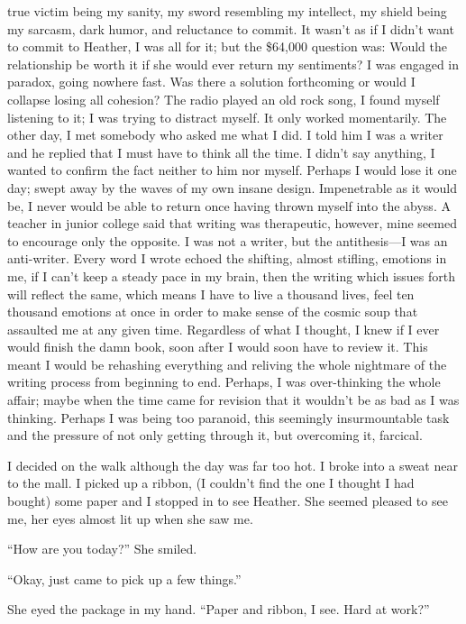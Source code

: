 true victim being my sanity, my sword resembling my intellect, my shield
being my sarcasm, dark humor, and reluctance to commit. It wasn't as if
I didn't want to commit to Heather, I was all for it; but the \$64,000
question was: Would the relationship be worth it if she would ever
return my sentiments? I was engaged in paradox, going nowhere fast. Was
there a solution forthcoming or would I collapse losing all cohesion?
The radio played an old rock song, I found myself listening to it; I was
trying to distract myself. It only worked momentarily. The other day, I
met somebody who asked me what I did. I told him I was a writer and he
replied that I must have to think all the time. I didn't say anything, I
wanted to confirm the fact neither to him nor myself. Perhaps I would
lose it one day; swept away by the waves of my own insane design.
Impenetrable as it would be, I never would be able to return once having
thrown myself into the abyss. A teacher in junior college said that
writing was therapeutic, however, mine seemed to encourage only the
opposite. I was not a writer, but the antithesis---I was an anti-writer.
Every word I wrote echoed the shifting, almost stifling, emotions in me,
if I can't keep a steady pace in my brain, then the writing which issues
forth will reflect the same, which means I have to live a thousand
lives, feel ten thousand emotions at once in order to make sense of the
cosmic soup that assaulted me at any given time. Regardless of what I
thought, I knew if I ever would finish the damn book, soon after I would
soon have to review it. This meant I would be rehashing everything and
reliving the whole nightmare of the writing process from beginning to
end. Perhaps, I was over-thinking the whole affair; maybe when the time
came for revision that it wouldn't be as bad as I was thinking. Perhaps
I was being too paranoid, this seemingly insurmountable task and the
pressure of not only getting through it, but overcoming it, farcical.

I decided on the walk although the day was far too hot. I broke into a
sweat near to the mall. I picked up a ribbon, (I couldn't find the one I
thought I had bought) some paper and I stopped in to see Heather. She
seemed pleased to see me, her eyes almost lit up when she saw me.

``How are you today?'' She smiled.

``Okay, just came to pick up a few things.''

She eyed the package in my hand. ``Paper and ribbon, I see. Hard at
work?''

